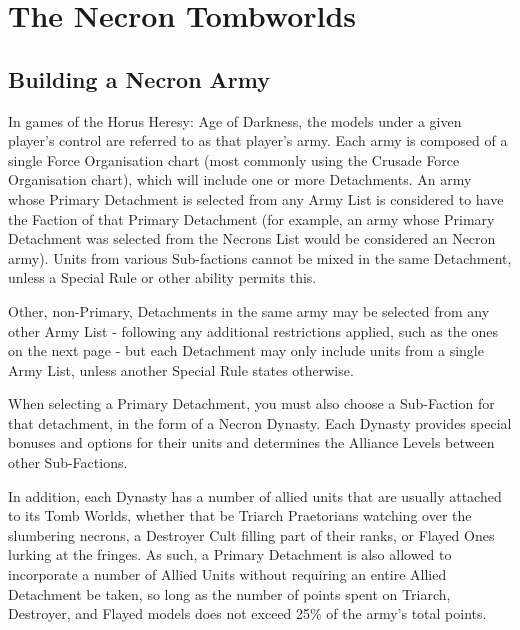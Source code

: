 \section{The Necron Tombworlds}


\subsection{Building a Necron Army}

In games of the Horus Heresy: Age of Darkness, the models under a given player’s control are referred to as that player’s army. Each army is composed of a single Force Organisation chart (most commonly using the Crusade Force Organisation chart), which will include one or more Detachments. An army whose Primary Detachment is selected from any Army List is considered to have the Faction of that Primary Detachment (for example, an army whose Primary Detachment was selected from the Necrons List would be considered an Necron army). Units from various Sub-factions cannot be mixed in the same Detachment, unless a Special Rule or other ability permits this.

Other, non-Primary, Detachments in the same army may be selected from any other Army List - following any additional restrictions applied, such as the ones on the next page - but each Detachment may only include units from a single Army List, unless another Special Rule states otherwise.

When selecting a Primary Detachment, you must also choose a Sub-Faction for that detachment, in the form of a Necron Dynasty. Each Dynasty provides special bonuses and options for their units and determines the Alliance Levels between other Sub-Factions.

In addition, each Dynasty has a number of allied units that are usually attached to its Tomb Worlds, whether that be Triarch Praetorians watching over the slumbering necrons, a Destroyer Cult filling part of their ranks, or Flayed Ones lurking at the fringes. As such, a Primary Detachment is also allowed to incorporate a number of Allied Units without requiring an entire Allied Detachment be taken, so long as the number of points spent on Triarch, Destroyer, and Flayed models does not exceed 25\% of the army's total points.